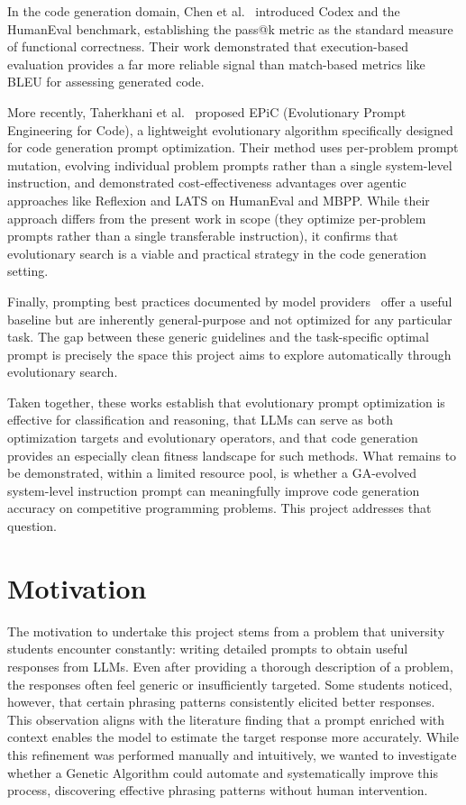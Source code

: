 \documentclass[conference]{IEEEtran}
\begin{document}
In the code generation domain, Chen et al.~\cite{chen2021codex} introduced Codex and the
HumanEval benchmark, establishing the pass@k metric as the standard measure of functional
correctness. Their work demonstrated that execution-based evaluation provides a far more
reliable signal than match-based metrics like BLEU for assessing generated code.

More recently, Taherkhani et al.~\cite{taherkhani2024epic} proposed EPiC (Evolutionary
Prompt Engineering for Code), a lightweight evolutionary algorithm specifically designed
for code generation prompt optimization. Their method uses per-problem prompt mutation,
evolving individual problem prompts rather than a single system-level instruction, and
demonstrated cost-effectiveness advantages over agentic approaches like Reflexion and LATS
on HumanEval and MBPP. While their approach differs from the present work in scope (they
optimize per-problem prompts rather than a single transferable instruction), it confirms
that evolutionary search is a viable and practical strategy in the code generation setting.

Finally, prompting best practices documented by model providers~\cite{meta2024prompting}
offer a useful baseline but are inherently general-purpose and not optimized for any
particular task. The gap between these generic guidelines and the task-specific optimal
prompt is precisely the space this project aims to explore automatically through
evolutionary search.

Taken together, these works establish that evolutionary prompt optimization is effective
for classification and reasoning, that LLMs can serve as both optimization targets and
evolutionary operators, and that code generation provides an especially clean fitness
landscape for such methods. What remains to be demonstrated, within a limited resource
pool, is whether a GA-evolved system-level instruction prompt can meaningfully improve
code generation accuracy on competitive programming problems. This project addresses that
question.

\section{Motivation}
\label{sec:motivation}

The motivation to undertake this project stems from a problem that university students
encounter constantly: writing detailed prompts to obtain useful responses from LLMs. Even
after providing a thorough description of a problem, the responses often feel generic or
insufficiently targeted. Some students noticed, however, that certain phrasing patterns
consistently elicited better responses. This observation aligns with the literature finding
that a prompt enriched with context enables the model to estimate the target response more
accurately. While this refinement was performed manually and intuitively, we wanted to
investigate whether a Genetic Algorithm could automate and systematically improve this
process, discovering effective phrasing patterns without human intervention.
\end{document}
